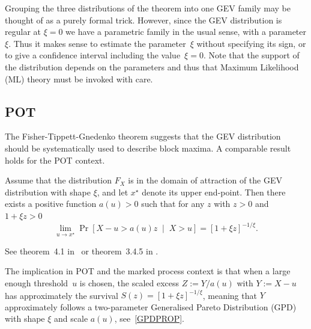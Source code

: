 \documentclass[a4paper]{report}
\newcommand{\bCond}[2]{\left[ #1 \;\middle\vert\; #2 \right]}
\newenvironment{Prov}
   {\medskip \par \noindent%
    \sf \color{blue} }%
  {\medskip \par}
\begin{document}
Grouping the three distributions of the theorem into one GEV family
may be thought of as a purely formal trick.  However, since the GEV
distribution is regular at $\xi =0$ we have a parametric family in the
usual sense, with a parameter $\xi$. Thus it makes sense to estimate
the parameter~$\xi$ without specifying its sign, or to give a
confidence interval including the value~$\xi=0$. Note that the support
of the distribution depends on the parameters and thus that Maximum
Likelihood (ML) theory must be invoked with care.

\subsection{POT}
\label{GEVGPD}
The Fisher-Tippett-Gnedenko theorem suggests that the GEV distribution should be 
systematically used to describe block maxima.  A comparable result holds for the 
POT context.

\begin{theo}
  
  Assume that the distribution $F_X$ is in the domain of attraction of
  the GEV distribution with shape $\xi$, and let $x^\star$ denote its 
  upper end-point. Then there exists a positive function $a(u) > 0$
  such that for any $z$ with $z > 0$ and $1 + \xi z > 0$
  $$
  \lim_{u \to x^\star} \Pr\bCond{X - u > a(u) z}{X > u}  =
  \left[ 1 + \xi z \right]^{-1/\xi}.
  $$ 
\end{theo}
\noindent
See theorem~4.1 in~\citet{COLES} or theorem~3.4.5 in \citet{EKM}.

The implication in POT and the marked process context is that when a
large enough threshold~$u$ is chosen, the scaled excess $Z:=Y/a(u)$
with $Y:= X-u$ has approximately the survival $S(z) = [1 + \xi
z]^{-1/\xi}$, meaning that $Y$ approximately follows a two-parameter
Generalised Pareto Distribution (GPD) with shape $\xi$ and scale
$a(u)$, see~\ref{GPDPROP}.

\end{document}
